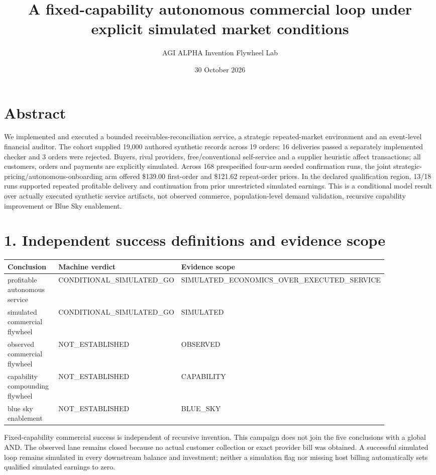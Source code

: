 \documentclass[10pt,letterpaper]{article}
\title{A fixed-capability autonomous commercial loop under explicit simulated market conditions}
\author{AGI ALPHA Invention Flywheel Lab}
\date{30 October 2026}
\begin{document}
\maketitle
\section*{Abstract}
We implemented and executed a bounded receivables-reconciliation service, a strategic repeated-market environment and an event-level financial auditor. The cohort supplied 19,000 authored synthetic records across 19 orders: 16 deliveries passed a separately implemented checker and 3 orders were rejected. Buyers, rival providers, free/conventional self-service and a supplier heuristic affect transactions; all customers, orders and payments are explicitly simulated. Across 168 prespecified four-arm seeded confirmation runs, the joint strategic-pricing/autonomous-onboarding arm offered \$139.00 first-order and \$121.62 repeat-order prices. In the declared qualification region, 13/18 runs supported repeated profitable delivery and continuation from prior unrestricted simulated earnings. This is a conditional model result over actually executed synthetic service artifacts, not observed commerce, population-level demand validation, recursive capability improvement or Blue Sky enablement.

\section*{1. Independent success definitions and evidence scope}
\begin{longtable}{>{\raggedright\arraybackslash}p{0.280\linewidth}>{\raggedright\arraybackslash}p{0.300\linewidth}>{\raggedright\arraybackslash}p{0.300\linewidth}}
\toprule
\textbf{Conclusion} & \textbf{Machine verdict} & \textbf{Evidence scope}\\
\midrule
\endhead
profitable autonomous service & CONDITIONAL\_\allowbreak{}SIMULATED\_\allowbreak{}GO & SIMULATED\_\allowbreak{}ECONOMICS\_\allowbreak{}OVER\_\allowbreak{}EXECUTED\_\allowbreak{}SERVICE\\
simulated commercial flywheel & CONDITIONAL\_\allowbreak{}SIMULATED\_\allowbreak{}GO & SIMULATED\\
observed commercial flywheel & NOT\_\allowbreak{}ESTABLISHED & OBSERVED\\
capability compounding flywheel & NOT\_\allowbreak{}ESTABLISHED & CAPABILITY\\
blue sky enablement & NOT\_\allowbreak{}ESTABLISHED & BLUE\_\allowbreak{}SKY\\
\bottomrule
\end{longtable}
Fixed-capability commercial success is independent of recursive invention. This campaign does not join the five conclusions with a global AND. The observed lane remains closed because no actual customer collection or exact provider bill was obtained. A successful simulated loop remains simulated in every downstream balance and investment; neither a simulation flag nor missing host billing automatically sets qualified simulated earnings to zero.
\end{document}
